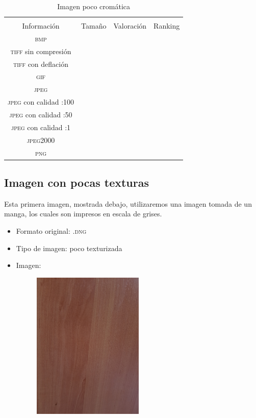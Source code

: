 \documentclass[11pt,a4paper]{article}
\begin{document}
\begin{table}[H]
\centering
\begin{tabular}{|c|c|c|c|}
\hline
\diagbox[width=15em]{\textit{Códec}/Formato}{\\Información} & Tamaño & Valoración & Ranking \\
\hline
\textsc{bmp} &  &  &  \\ \hline
\textsc{tiff} sin compresión &  &  &  \\ \hline
\textsc{tiff} con deflación &  &  &  \\ \hline
\textsc{gif} &  &  &  \\ \hline
\textsc{jpeg} &  &  &  \\ \hline
\textsc{jpeg} con calidad :100 &  &  &  \\ \hline
\textsc{jpeg} con calidad :50 &  &  &  \\ \hline
\textsc{jpeg} con calidad :1 &  &  &  \\ \hline
\textsc{jpeg2000} &  &  &  \\ \hline
\textsc{png} &  &  &  \\ \hline
\end{tabular}
\caption{Imagen poco cromática}
\label{tab:my-table}
\end{table}


\subsection{Imagen con pocas texturas}

Esta primera imagen, mostrada debajo, utilizaremos una imagen tomada de un manga, los cuales son impresos en escala de grises.

\begin{itemize}
	\item Formato original: \textsc{.dng}
	\item Tipo de imagen: poco texturizada
	\item Imagen:
		\begin{figure}[H]
		\centering
			\includegraphics[width=0.5\textwidth]{Fotos/pocas_texturas.jpg}
		\end{figure}	
\end{itemize}
\end{document}
